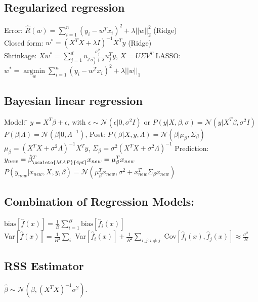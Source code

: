 \subsection*{Regularized regression}
Error: $\hat{R}(w) = \sum \limits_{i=1}^n (y_i - w^Tx_i)^2 + \lambda ||w||_2^2$ (Ridge) \\
Closed form: $w^*=(X^T X + \lambda I)^{-1} X^T y$ (Ridge)\\
{\small{} Shrinkage:} $Xw^*{=}\sum_{j=1}^{d} u_j\frac{\sigma_j^2}{\sigma_j^2+\lambda}u_j^Ty$, $X{=}U\Sigma V^T$ 
LASSO: $w^* = \underset{w}{\operatorname{argmin}} \sum \limits_{i=1}^n (y_i - w^Tx_i)^2 + \lambda ||w||_1$

\subsection*{Bayesian linear regression}
	Model:  \= $y = X^T \beta + \epsilon$, with $\epsilon \sim
	\mathcal{N}(\epsilon | 0, \sigma^2 I)$ or 
	\> $P(y | X, \beta, \sigma) = \mathcal{N}(y | X^T \beta , \sigma^2 I)$ 
	$P(\beta | \Lambda) = \mathcal{N} (\beta | 0, \Lambda^{-1})$, Post: $P(\beta | X, y, \Lambda) = \mathcal{N}(\beta | \mu_\beta, \Sigma_\beta)$ 
	$\mu_\beta = (X^T X + \sigma^2 \Lambda)^{-1} X^T y$, $\Sigma_\beta = \sigma^2(X^T X + \sigma^2 \Lambda)^{-1}$ 
	Prediction: \> $y_{new} = \hat{\beta}_{\scaleto{MAP}{4pt}}^T x_{new} = \mu_\beta ^T x_{new}$ 
	$P(y_{new} | x_{new}, X, y, \beta) 
	= \mathcal{N}(\mu_\beta ^T x_{new}, \sigma^2 + x_{new}^T \Sigma_\beta x_{new})$

\subsection*{Combination of Regression Models:}
$\text{bias}[\hat{f}(x)] = \frac{1}{B} \sum_{i=1}^{B} \text{bias}[\hat{f}_i(x)]$\\
Var$[\hat{f}(x)] = \frac{1}{B^2}\sum_i$ Var$[\hat{f}_i(x)]
+ \frac{1}{B^2}\sum_{i,j:i\neq j}$ Cov$[\hat{f}_i(x), \hat{f}_j(x)] \approx \frac{\sigma^2}{B}$

\subsection*{RSS Estimator}
$\hat{\beta} \sim \mathcal{N}(\beta,(X^TX)^{-1}\sigma^2)$.

